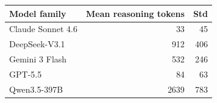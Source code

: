 \begin{tabular}{lrr}
\toprule
Model family & Mean reasoning tokens & Std \\
\midrule
Claude Sonnet 4.6 & 33 & 45 \\
DeepSeek-V3.1 & 912 & 406 \\
Gemini 3 Flash & 532 & 246 \\
GPT-5.5 & 84 & 63 \\
Qwen3.5-397B & 2639 & 783 \\
\bottomrule
\end{tabular}